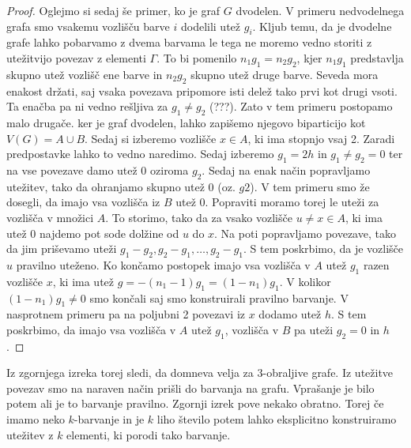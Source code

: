 \documentclass[12pt,a4paper,twoside]{article}
\theoremstyle{definition} %
\theoremstyle{plain} %
\numberwithin{equation}{section}  %
\begin{document}
\begin{proof}
	Oglejmo si sedaj še primer, ko je graf $G$ dvodelen. V primeru nedvodelnega grafa smo vsakemu vozlišču barve $i$ dodelili utež $g_i$. Kljub temu, da je dvodelne grafe lahko pobarvamo z dvema barvama le tega ne moremo vedno storiti z utežitvijo povezav z elementi $\Gamma$. To bi pomenilo $n_1 g_1 = n_2 g_2$, kjer $n_1 g_1$ predstavlja skupno utež vozlišč ene barve in $n_2 g_2$ skupno utež druge barve. Seveda mora enakost držati, saj vsaka povezava pripomore isti delež tako prvi kot drugi vsoti. Ta enačba pa ni vedno rešljiva za $g_1 \neq g_2$ (???). Zato v tem primeru postopamo malo drugače. ker je graf dvodelen, lahko zapišemo njegovo biparticijo kot $V(G) = A \cup B$. Sedaj si izberemo vozlišče $x \in A$, ki ima stopnjo vsaj 2. Zaradi predpostavke lahko to vedno naredimo. Sedaj izberemo $g_1 = 2h$ in $g_1 \neq g_2 = 0$ ter na vse povezave damo utež 0 oziroma $g_2$. Sedaj na enak način popravljamo utežitev, tako da ohranjamo skupno utež 0 (oz. $g2$). V tem primeru smo že dosegli, da imajo vsa vozlišča iz $B$ utež 0. Popraviti moramo torej le uteži za vozlišča v množici $A$. To storimo, tako da za vsako vozlišče $u \neq x \in A$, ki ima utež 0 najdemo pot sode dolžine od $u$ do $x$. Na poti popravljamo povezave, tako da jim priševamo uteži $g_1 - g_2, g_2 - g_1, \ldots, g_2 - g_1$. S tem poskrbimo, da je vozlišče $u$ pravilno uteženo. Ko končamo postopek imajo vsa vozlišča v $A$ utež $g_1$ razen vozlišče $x$, ki ima utež $g = -(n_1 - 1) g_1 = (1 - n_1) g_1$. V kolikor $(1 - n_1)g_1 \neq 0$ smo končali saj smo konstruirali pravilno barvanje. V nasprotnem primeru pa na poljubni 2 povezavi iz $x$ dodamo utež $h$. S tem poskrbimo, da imajo vsa vozlišča v $A$ utež $g_1$, vozlišča v $B$ pa uteži $g_2 = 0$ in $h$.
\end{proof}

Iz zgornjega izreka torej sledi, da domneva velja za $3$-obraljive grafe. Iz utežitve povezav smo na naraven način prišli do barvanja na grafu. Vprašanje je bilo potem ali je to barvanje pravilno. Zgornji izrek pove nekako obratno. Torej če imamo neko $k$-barvanje in je $k$ liho število potem lahko eksplicitno konstruiramo utežitev z $k$ elementi, ki porodi tako barvanje.


 
\end{document}
